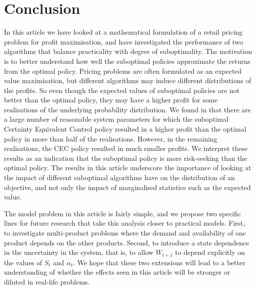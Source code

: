 \documentclass{rsproca_new}
\theoremstyle{definition}
\begin{document}
\section{Conclusion}\label{sec:conclusion}
In this article we have looked at a mathematical formulation of a
retail pricing problem for profit maximisation, and have investigated the
performance of two algorithms that balance practicality
with degree of suboptimality. The motivation is to better understand
how well the suboptimal policies approximate the returns from the
optimal policy.
Pricing problems are often formulated as an expected value
maximisation, but different algorithms may induce different
distributions of the profits.
So even though the expected values of suboptimal policies are not better
than the optimal policy, they may have a higher profit for some
realisations of the underlying probability distribution.
We found in  that there are a
large number of
reasonable system parameters for which
the suboptimal Certainty Equivalent Control policy resulted in a higher profit
than the optimal policy in more than half of the realisations.
However, in the remaining realisations, the CEC policy resulted in
much smaller profits. We interpret these results as an indication that
the suboptimal policy is more risk-seeking than the optimal policy.
The results in this article underscore the importance of looking at
the impact of
different suboptimal algorithms have on the distribution of
an objective, and not only the impact of
marginalised statistics such as the expected value.

The model problem in this article is fairly simple, and
we propose two specific lines for future research that
take this analysis closer to practical models.
First, to investigate multi-product problems where the demand and
availability of one product depends on the other products.
Second, to introduce a state dependence in the uncertainty in the
system, that is, to allow $W_{t+1}$ to depend explicitly on the values
of $S_t$ and $\alpha_t$.
We hope that these two extensions will lead to a better understanding of
whether the effects seen in this article will be stronger or diluted
in real-life problems.





\end{document}
